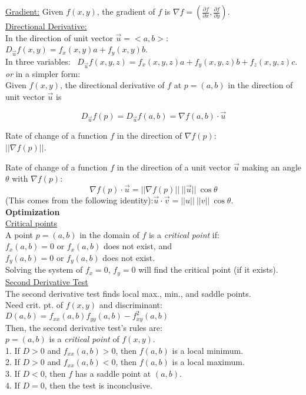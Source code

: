 \documentclass[10pt]{extarticle}
\begin{document}
\noindent
\underline{Gradient:} Given $f(x,y)$, the gradient of $f$ is $\nabla f = \left(\frac{\partial{f}}{\partial{x}},\frac{\partial{f}}{\partial{y}}\right)$.\\

\noindent
\underline{Directional Derivative:}\\
In the direction of unit vector $\vec{u}=<a,b>$: \ ${D_{\vec u}}f\left( {x,y} \right) = {f_x}\left( {x,y} \right)a + {f_y}\left( {x,y} \right)b$.\\

In three variables: \ ${D_{\vec u}}f\left( {x,y,z} \right) = {f_x}\left( {x,y,z} \right)a + {f_y}\left( {x,y,z} \right)b + {f_z}\left( {x,y,z} \right)c$.\\
\emph{or} in a simpler form:\\
Given $f(x,y)$, the directional derivative of $f$ at $p = (a,b)$ in the direction of unit vector $\vec{u}$ is

$$
{D_{\vec u}}f\left( {p} \right) = {D_{\vec u}}f\left( {a,b} \right) = \nabla f(a,b) \cdot \vec{u}
$$

Rate of change of a function $f$ in the direction of $\nabla f(p)$:\\$||\nabla f(p)||$.

Rate of change of a function $f$ in the direction of a unit vector $\vec{u}$ making an angle $\theta$ with $\nabla f(p)$:\\
$$
\nabla f(p) \cdot \vec{u} = ||\nabla f(p)|| \ ||\vec{u}|| \ \cos \theta
$$
(This comes from the following identity):$\vec{u} \cdot \vec{v} = ||u|| \ ||v|| \ \cos \theta$.\\

\textbf{Optimization}\\
\underline{Critical points}\\
A point $p = (a,b)$ in the domain of $f$ is a \emph{critical point} if:\\
$f_x(a,b) = 0$ or $f_x(a,b)$ does not exist, and\\
$f_y(a,b) = 0$ or $f_y(a,b)$ does not exist.\\

Solving the system of $f_x = 0$, $f_y = 0$ will find the critical point (if it exists).\\

\underline{Second Derivative Test}\\
The second derivative test finds local max., min., and saddle points.\\
Need crit. pt. of $f(x,y)$ and discriminant: \ $D(a,b) = f_{xx}(a,b) f_{yy}(a,b) - f_{xy}^2(a,b)$\\
Then, the second derivative test's rules are:\\
 $p = (a,b)$ is a \emph{critical point} of $f(x,y)$.\\
1. If $D > 0$ and $f_{xx}(a,b) > 0$, then $f(a,b)$ is a local minimum.\\
2. If $D > 0$ and $f_{xx}(a,b) < 0$, then $f(a,b)$ is a local maximum.\\
3. If $D < 0$, then $f$ has a saddle point at $(a,b)$.\\
4. If $D = 0$, then the test is inconclusive.\\
\end{document}
